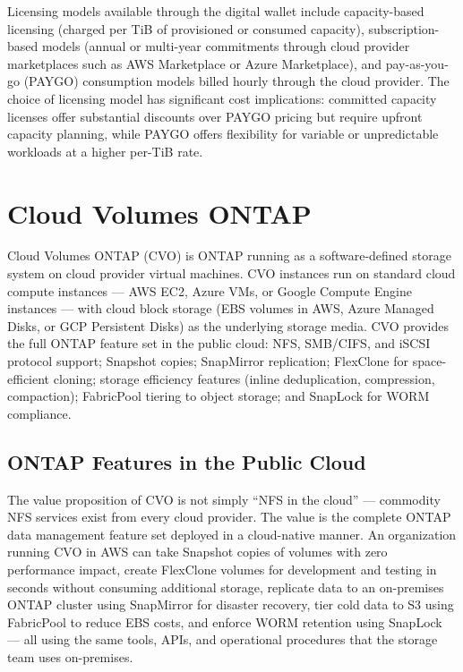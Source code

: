 Licensing models available through the digital wallet include capacity-based licensing (charged per TiB of provisioned or consumed capacity), subscription-based models (annual or multi-year commitments through cloud provider marketplaces such as AWS Marketplace or Azure Marketplace), and pay-as-you-go (PAYGO) consumption models billed hourly through the cloud provider. The choice of licensing model has significant cost implications: committed capacity licenses offer substantial discounts over PAYGO pricing but require upfront capacity planning, while PAYGO offers flexibility for variable or unpredictable workloads at a higher per-TiB rate.

\section{Cloud Volumes ONTAP}

Cloud Volumes ONTAP (CVO) is ONTAP running as a software-defined storage system on cloud provider virtual machines. CVO instances run on standard cloud compute instances --- AWS EC2, Azure VMs, or Google Compute Engine instances --- with cloud block storage (EBS volumes in AWS, Azure Managed Disks, or GCP Persistent Disks) as the underlying storage media. CVO provides the full ONTAP feature set in the public cloud: NFS, SMB/CIFS, and iSCSI protocol support; Snapshot copies; SnapMirror replication; FlexClone for space-efficient cloning; storage efficiency features (inline deduplication, compression, compaction); FabricPool tiering to object storage; and SnapLock for WORM compliance.

\subsection{ONTAP Features in the Public Cloud}

The value proposition of CVO is not simply ``NFS in the cloud'' --- commodity NFS services exist from every cloud provider. The value is the complete ONTAP data management feature set deployed in a cloud-native manner. An organization running CVO in AWS can take Snapshot copies of volumes with zero performance impact, create FlexClone volumes for development and testing in seconds without consuming additional storage, replicate data to an on-premises ONTAP cluster using SnapMirror for disaster recovery, tier cold data to S3 using FabricPool to reduce EBS costs, and enforce WORM retention using SnapLock --- all using the same tools, APIs, and operational procedures that the storage team uses on-premises.

